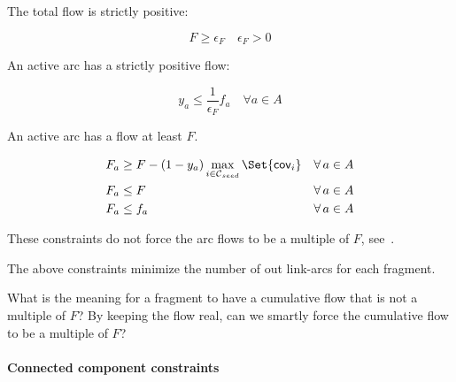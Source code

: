 The total flow is strictly positive:
\begin{Constraint}
  \begin{equation}
    F \geq \epsilon_F \quad \epsilon_F > 0 \label{pbf_iterbin:milp:cst:flow:total_flow_strictly_positive} %
  \end{equation}
\end{Constraint}

An active arc has a strictly positive flow:
\begin{Constraint}
  \begin{equation}
    y_a \leq \frac{1}{\epsilon_F} f_a \quad \forall a \in A \label{pbf_iterbin:milp:cst:flow:arc_flow_strictly_positive} %
  \end{equation}
\end{Constraint}

An active arc has a flow at least \(F\).
\begin{Constraint}
  \begin{align}
    F_a & \geq F - (1 - y_a) \max_{i \in \ContigSeeds{}}\Set{\cov{i}} & \forall a \in A \label{pbf_iterbin:milp:cst:flow:arc_flow_at_least_total_flow_1} \\ %
    F_a & \leq F & \forall a \in A \label{pbf_iterbin:milp:cst:flow:arc_flow_at_least_total_flow_2} \\ %
    F_a & \leq f_a & \forall a \in A \label{pbf_iterbin:milp:cst:flow:arc_flow_at_least_total_flow_3} %
  \end{align}
\end{Constraint}
\begin{infobox}
  These constraints do not force the arc flows to be a multiple of \(F\), see~.
\end{infobox}
\begin{missingproofbox}
  The above constraints minimize the number of out link-arcs for each fragment.
\end{missingproofbox}
\begin{questionbox}
  What is the meaning for a fragment to have a cumulative flow that is not a multiple of \(F\)?
  By keeping the flow real, can we smartly force the cumulative flow to be a multiple of \(F\)?
\end{questionbox}

\paragraph{Connected component constraints}

